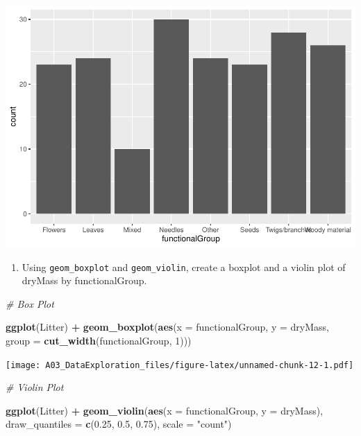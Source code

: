 \documentclass[]{article}
\newenvironment{Shaded}{\begin{snugshade}}{\end{snugshade}}
\newcommand{\KeywordTok}[1]{\textcolor[rgb]{0.13,0.29,0.53}{\textbf{#1}}}
\newcommand{\DataTypeTok}[1]{\textcolor[rgb]{0.13,0.29,0.53}{#1}}
\newcommand{\DecValTok}[1]{\textcolor[rgb]{0.00,0.00,0.81}{#1}}
\newcommand{\FloatTok}[1]{\textcolor[rgb]{0.00,0.00,0.81}{#1}}
\newcommand{\StringTok}[1]{\textcolor[rgb]{0.31,0.60,0.02}{#1}}
\newcommand{\CommentTok}[1]{\textcolor[rgb]{0.56,0.35,0.01}{\textit{#1}}}
\newcommand{\OperatorTok}[1]{\textcolor[rgb]{0.81,0.36,0.00}{\textbf{#1}}}
\newcommand{\NormalTok}[1]{#1}
\providecommand{\tightlist}{%
  \setlength{\itemsep}{0pt}\setlength{\parskip}{0pt}}
\begin{document}
\includegraphics{A03_DataExploration_files/figure-latex/unnamed-chunk-11-1.pdf}

\begin{enumerate}
\def\labelenumi{\arabic{enumi}.}
\setcounter{enumi}{14}
\tightlist
\item
  Using \texttt{geom\_boxplot} and \texttt{geom\_violin}, create a
  boxplot and a violin plot of dryMass by functionalGroup.
\end{enumerate}

\begin{Shaded}
\begin{Highlighting}[]
\CommentTok{# Box Plot}

\KeywordTok{ggplot}\NormalTok{(Litter) }\OperatorTok{+}
\StringTok{  }\KeywordTok{geom_boxplot}\NormalTok{(}\KeywordTok{aes}\NormalTok{(}\DataTypeTok{x =}\NormalTok{ functionalGroup, }\DataTypeTok{y =}\NormalTok{ dryMass, }\DataTypeTok{group =} \KeywordTok{cut_width}\NormalTok{(functionalGroup, }\DecValTok{1}\NormalTok{)))}
\end{Highlighting}
\end{Shaded}

\texttt{[image: A03\_DataExploration\_files/figure-latex/unnamed-chunk-12-1.pdf]}

\begin{Shaded}
\begin{Highlighting}[]
\CommentTok{# Violin Plot}

\KeywordTok{ggplot}\NormalTok{(Litter) }\OperatorTok{+}
\StringTok{  }\KeywordTok{geom_violin}\NormalTok{(}\KeywordTok{aes}\NormalTok{(}\DataTypeTok{x =}\NormalTok{ functionalGroup, }\DataTypeTok{y =}\NormalTok{ dryMass),}
              \DataTypeTok{draw_quantiles =} \KeywordTok{c}\NormalTok{(}\FloatTok{0.25}\NormalTok{, }\FloatTok{0.5}\NormalTok{, }\FloatTok{0.75}\NormalTok{), }
              \DataTypeTok{scale =} \StringTok{"count"}\NormalTok{)}
\end{Highlighting}
\end{Shaded}
\end{document}
